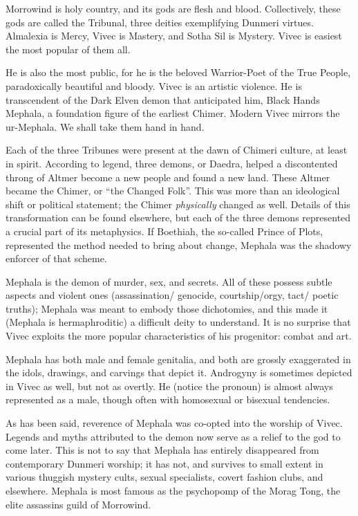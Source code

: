 
\dropcap Morrowind is holy country, and its gods are flesh and blood. Collectively, these gods are called the Tribunal, three deities exemplifying Dunmeri virtues. Almalexia is Mercy, Vivec is Mastery, and Sotha Sil is Mystery. Vivec is easiest the most popular of them all.

He is also the most public, for he is the beloved Warrior-Poet of the True People, paradoxically beautiful and bloody. Vivec is an artistic violence. He is transcendent of the Dark Elven demon that anticipated him, Black Hands Mephala, a foundation figure of the earliest Chimer. Modern Vivec mirrors the ur-Mephala. We shall take them hand in hand.

Each of the three Tribunes were present at the dawn of Chimeri culture, at least in spirit. According to legend, three demons, or Daedra, helped a discontented throng of Altmer become a new people and found a new land. These Altmer became the Chimer, or “the Changed Folk”. This was more than an ideological shift or political statement; the Chimer \textit{physically} changed as well. Details of this transformation can be found elsewhere, but each of the three demons represented a crucial part of its metaphysics. If Boethiah, the so-called Prince of Plots, represented the method needed to bring about change, Mephala was the shadowy enforcer of that scheme.

Mephala is the demon of murder, sex, and secrets. All of these possess subtle aspects and violent ones (assassination/ genocide, courtship/orgy, tact/ poetic truths); Mephala was meant to embody those dichotomies, and this made it (Mephala is hermaphroditic) a difficult deity to understand. It is no surprise that Vivec exploits the more popular characteristics of his progenitor: combat and art.

Mephala has both male and female genitalia, and both are grossly exaggerated in the idols, drawings, and carvings that depict it. Androgyny is sometimes depicted in Vivec as well, but not as overtly. He (notice the pronoun) is almost always represented as a male, though often with homosexual or bisexual tendencies.

As has been said, reverence of Mephala was co-opted into the worship of Vivec. Legends and myths attributed to the demon now serve as a relief to the god to come later. This is not to say that Mephala has entirely disappeared from contemporary Dunmeri worship; it has not, and survives to small extent in various thuggish mystery cults, sexual specialists, covert fashion clubs, and elsewhere. Mephala is most famous as the psychopomp of the Morag Tong, the elite assassins guild of Morrowind.